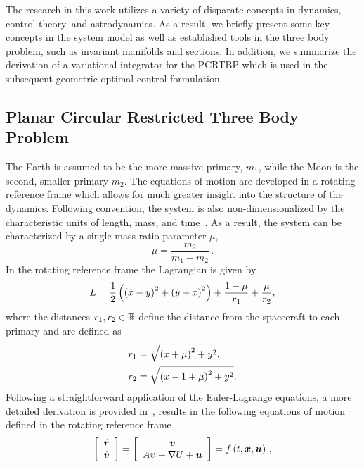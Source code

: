 \documentclass[smallcondensed]{svjour3}
\begin{document}
The research in this work utilizes a variety of disparate concepts in dynamics, control theory, and astrodynamics. 
As a result, we briefly present some key concepts in the system model as well as established tools in the three body problem, such as invariant manifolds and \Poincare sections.
In addition, we summarize the derivation of a variational integrator for the PCRTBP which is used in the subsequent geometric optimal control formulation.
\subsection{Planar Circular Restricted Three Body Problem}\label{sec:pcrtbp}
The Earth is assumed to be the more massive primary, \( m_1 \), while the Moon is the second, smaller primary \( m_2\).
The equations of motion are developed in a rotating reference frame which allows for much greater insight into the structure of the dynamics.
Following convention, the system is also non-dimensionalized by the characteristic units of length, mass, and time~\cite{koon2011}.
As a result, the system can be characterized by a single mass ratio parameter \( \mu \),
\begin{equation}
        \mu = \frac{m_2}{m_1+m_2} \, .
        \label{eq:mass_param}
\end{equation}
In the rotating reference frame the Lagrangian is given by
\begin{equation}\label{eq:lagrangian}
    L = \frac{1}{2} \left( \left( \dot{x} - y \right)^2 + \left( \dot{y} + x \right)^2 \right) + \frac{1 - \mu}{r_1} + \frac{\mu}{r_2},
\end{equation}
where the distances \( r_1, r_2 \in \mathbb{R} \) define the distance from the spacecraft to each primary and are defined as
\begin{align}
    r_1 &= \sqrt{\left( x + \mu \right)^2 + y^2} , \\
    r_2 &= \sqrt{\left( x -1 + \mu \right)^2 + y^2} .
\end{align}
Following a straightforward application of the Euler-Lagrange equations, a more detailed derivation is provided in~\cite{szebehely1967}, results in the following equations of motion defined in the rotating reference frame
\begin{equation}\label{eqn:cont_dyn}
        \left[\begin{array}{c} \dot{\bm{r}} \\ \dot{\bm{v}} \end{array} \right] = 
        \left[ \begin{array}{c} \bm{v} \\ A \bm{v} + \nabla U + \bm{u} \end{array} \right] = f\left( t,\bm{x}, \bm{u}\right) \, ,
\end{equation}
\end{document}
